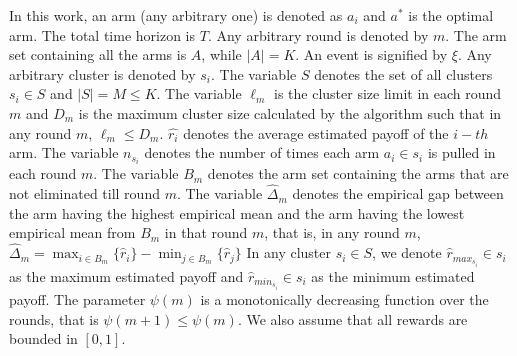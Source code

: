 In this work, an arm (any arbitrary one) is denoted as $a_{i}$ and $a^{*}$ is the optimal arm. The total time horizon is $T$. Any arbitrary round is denoted by $m$. The arm set containing all the arms is $A$, while $|A|=K$. An event is signified by $\xi$. Any arbitrary cluster is denoted by $s_{i}$. The variable $S$ denotes the set of all clusters $s_{i}\in S$ and $|S|=M\leq K$. The variable $\ell_{m}$ is the cluster size limit in each round $m$ and $D_{m}$ is the maximum cluster size calculated by the algorithm such that in any round $m$, $\ell_{m}\leq D_{m}$. 
$\hat{r_i}$ denotes the average estimated payoff of the $i-th$ arm. The variable $n_{s_{i}}$ denotes the number of times each arm $a_{i}\in s_{i}$ is pulled in each round $m$. The variable $B_{m}$ denotes the arm set containing the arms that are not eliminated till round $m$. 
The variable $\hat{\Delta}_{m}$ denotes the empirical gap between the arm having the highest empirical mean and the arm having the lowest empirical mean from $B_{m}$ in that round $m$, that is, in any round $m$, 
$\hat{\Delta}_{m}=\max_{i\in B_{m}}{\lbrace\hat{r}_{i}\rbrace}-\min_{j\in B_{m}}{\lbrace\hat{r}_{j}\rbrace}$
 In any cluster $s_{i}\in S$, we denote $\hat{r}_{max_{s_{i}}}\in s_{i}$ as the maximum estimated payoff and $\hat{r}_{min_{s_{i}}}\in s_{i}$ as the minimum estimated payoff. 
The parameter $\psi(m)$ is a monotonically decreasing function over the rounds, that is $\psi(m+1)\leq \psi(m)$. 
We also assume that all rewards are bounded in $[0,1]$.
